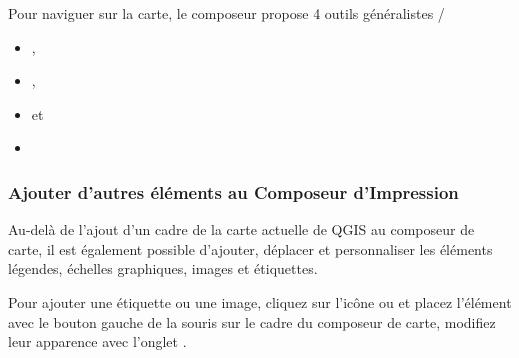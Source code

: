 Pour naviguer sur la carte, le composeur propose 4 outils généralistes /

\begin{itemize}
\item {},
\item {},
\item {} et
\item {}
\end{itemize}

\subsubsection{Ajouter d'autres éléments au Composeur d'Impression}

Au-delà de l'ajout d'un cadre de la carte actuelle de QGIS au composeur de carte, il est également possible d'ajouter, déplacer et personnaliser les
éléments légendes, échelles graphiques, images et étiquettes.


Pour ajouter une étiquette ou une image, cliquez sur l'icône  ou  et placez l'élément avec le bouton gauche de la souris sur le cadre du composeur de carte, modifiez leur apparence avec l'onglet .


